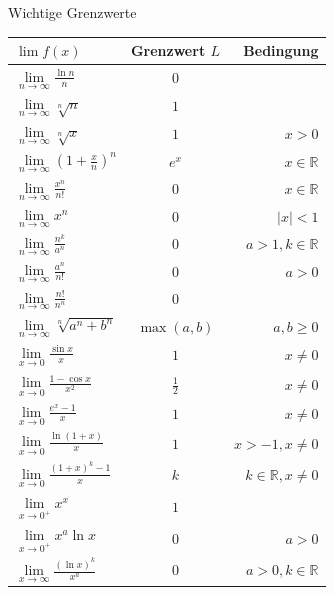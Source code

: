 \begin{minipage}{\linewidth}
\Tab Wichtige Grenzwerte

\begin{tabular}{l c r}
    $\lim f(x)$ & Grenzwert $L$ & Bedingung \\
    \hline
    $\lim\limits_{n\to\infty} \frac{\ln n}{n}$ & $0$ & \\[1ex]
    $\lim\limits_{n\to\infty} \sqrt[n]{n}$ & $1$ & \\[1ex]
    $\lim\limits_{n\to\infty} \sqrt[n]{x}$ & $1$ & $x > 0$ \\[1ex]
    $\lim\limits_{n\to\infty} \left(1 + \frac{x}{n}\right)^n$ & $e^x$ & $x \in \mathbb{R}$ \\[1ex]
    $\lim\limits_{n\to\infty} \frac{x^n}{n!}$ & $0$ & $x \in \mathbb{R}$ \\[0.5ex]
    \hline
    $\lim\limits_{n\to\infty} x^n$ & $0$ & $|x| < 1$ \\[1ex]
    $\lim\limits_{n\to\infty} \frac{n^k}{a^n}$ & $0$ & $a > 1, k \in \mathbb{R}$ \\[1ex]
    $\lim\limits_{n\to\infty} \frac{a^n}{n!}$ & $0$ & $a > 0$ \\[1ex]
    $\lim\limits_{n\to\infty} \frac{n!}{n^n}$ & $0$ & \\[1ex]
    $\lim\limits_{n\to\infty} \sqrt[n]{a^n + b^n}$ & $\max(a, b)$ & $a, b \ge 0$ \\
    \hline
    $\lim\limits_{x\to 0} \frac{\sin x}{x}$ & $1$ & $x \neq 0$ \\[1ex]
    $\lim\limits_{x\to 0} \frac{1 - \cos x}{x^2}$ & $\frac{1}{2}$ & $x \neq 0$ \\[1ex]
    $\lim\limits_{x\to 0} \frac{e^x - 1}{x}$ & $1$ & $x \neq 0$ \\[1ex]
    $\lim\limits_{x\to 0} \frac{\ln(1 + x)}{x}$ & $1$ & $x > -1, x \neq 0$ \\[1ex]
    $\lim\limits_{x\to 0} \frac{(1 + x)^k - 1}{x}$ & $k$ & $k \in \mathbb{R}, x \neq 0$ \\[0.5ex]
    \hline
    $\lim\limits_{x\to 0^+} x^x$ & $1$ & \\[1ex]
    $\lim\limits_{x\to 0^+} x^a \ln x$ & $0$ & $a > 0$ \\[1ex]
    $\lim\limits_{x\to\infty} \frac{(\ln x)^k}{x^a}$ & $0$ & $a > 0, k \in \mathbb{R}$
\end{tabular}
\end{minipage}

